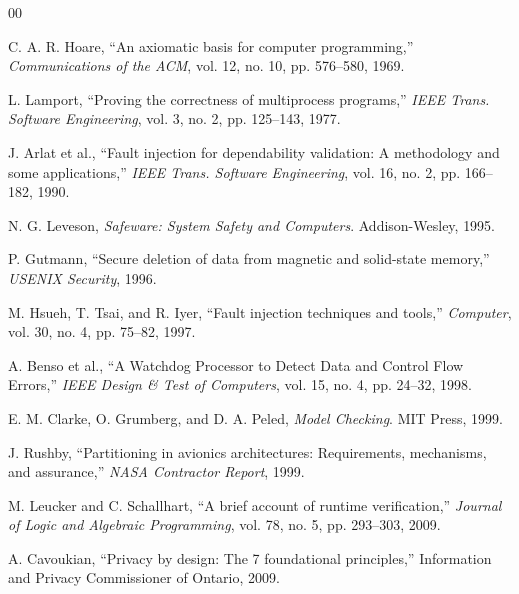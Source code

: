 \documentclass[conference]{IEEEtran}
\begin{document}
\begin{thebibliography}{00}

 C. A. R. Hoare, ``An axiomatic basis for computer programming,'' \textit{Communications of the ACM}, vol. 12, no. 10, pp. 576--580, 1969.

 L. Lamport, ``Proving the correctness of multiprocess programs,'' \textit{IEEE Trans. Software Engineering}, vol. 3, no. 2, pp. 125--143, 1977.


 J. Arlat et al., ``Fault injection for dependability validation: A methodology and some applications,'' \textit{IEEE Trans. Software Engineering}, vol. 16, no. 2, pp. 166--182, 1990.

 N. G. Leveson, \textit{Safeware: System Safety and Computers}. Addison-Wesley, 1995.


 P. Gutmann, ``Secure deletion of data from magnetic and solid-state memory,'' \textit{USENIX Security}, 1996.


 M. Hsueh, T. Tsai, and R. Iyer, ``Fault injection techniques and tools,'' \textit{Computer}, vol. 30, no. 4, pp. 75--82, 1997.


 A. Benso et al., ``A Watchdog Processor to Detect Data and Control Flow Errors,'' \textit{IEEE Design \& Test of Computers}, vol. 15, no. 4, pp. 24--32, 1998.


 E. M. Clarke, O. Grumberg, and D. A. Peled, \textit{Model Checking}. MIT Press, 1999.

 J. Rushby, ``Partitioning in avionics architectures: Requirements, mechanisms, and assurance,'' \textit{NASA Contractor Report}, 1999.

 M. Leucker and C. Schallhart, ``A brief account of runtime verification,'' \textit{Journal of Logic and Algebraic Programming}, vol. 78, no. 5, pp. 293--303, 2009.


 A. Cavoukian, ``Privacy by design: The 7 foundational principles,'' Information and Privacy Commissioner of Ontario, 2009.


\end{thebibliography}
\end{document}
